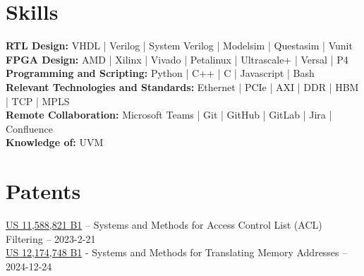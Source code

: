 \documentclass[10pt]{deedy-resume-reversed}
\begin{document}
\begin{minipage}[t]{1.0\textwidth}




\section{Skills}
\textbf{RTL Design:} VHDL | Verilog | System Verilog | Modelsim | Questasim | Vunit \\
\textbf{FPGA Design:} AMD | Xilinx | Vivado | Petalinux | Ultrascale+ | Versal | P4 \\
\textbf{Programming and Scripting:} Python | C++ | C | Javascript | Bash \\
\textbf{Relevant Technologies and Standards:} Ethernet | PCIe | AXI | DDR | HBM | TCP | MPLS \\
\textbf{Remote Collaboration:} Microsoft Teams | Git | GitHub | GitLab | Jira | Confluence \\
\textbf{Knowledge of:} UVM \\
\sectionsep


\section{Patents}
\href{https://image-ppubs.uspto.gov/dirsearch-public/print/downloadPdf/11588821}{US 11,588,821 B1}
– Systems and Methods for Access Control List (ACL) Filtering – 2023-2-21 \\
\href{https://image-ppubs.uspto.gov/dirsearch-public/print/downloadPdf/12174748}{US 12,174,748 B1}
- Systems and Methods for Translating Memory Addresses – 2024-12-24 \\
\sectionsep

\end{minipage}
\end{document}
